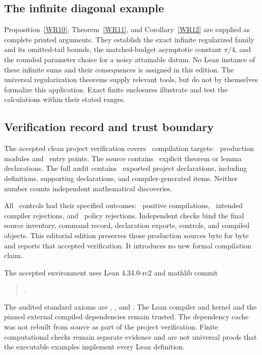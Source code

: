 \subsection{The infinite diagonal example}
Proposition~\ref{WR10}, Theorem~\ref{WR11}, and Corollary~\ref{WR12} are supplied as complete printed arguments. They establish the exact infinite regularized family and its omitted-tail bounds, the matched-budget asymptotic constant $\pi/4$, and the rounded parameter choice for a noisy attainable datum. No Lean instance of these infinite sums and their consequences is assigned in this edition. The universal regularization theorems supply relevant tools, but do not by themselves formalize this application. Exact finite enclosures illustrate and test the calculations within their stated ranges.

\subsection{Verification record and trust boundary}
The accepted clean project verification covers \EditionTargets\ compilation targets: \EditionProductionModules\ production modules and \EditionRoots\ entry points. The source contains \EditionTheorems\ explicit theorem or lemma declarations. The full audit contains \EditionDeclarations\ exported project declarations, including definitions, supporting declarations, and compiler-generated items. Neither number counts independent mathematical discoveries.

All \EditionControls\ controls had their specified outcomes: \EditionPositiveControls\ positive compilations, \EditionNegativeControls\ intended compiler rejections, and \EditionPolicyControls\ policy rejections. Independent checks bind the final source inventory, command record, declaration exports, controls, and compiled objects. This editorial edition preserves those production sources byte for byte and reports that accepted verification. It introduces no new formal compilation claim.

The accepted environment uses Lean 4.34.0-rc2 and mathlib commit
\begin{quote}\small{}.\end{quote}
The audited standard axioms are , , and . The Lean compiler and kernel and the pinned external compiled dependencies remain trusted. The dependency cache was not rebuilt from source as part of the project verification. Finite computational checks remain separate evidence and are not universal proofs that the executable examples implement every Lean definition.
